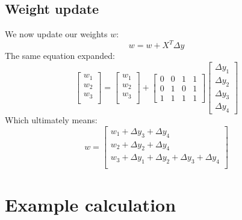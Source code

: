 \documentclass[10pt,a4paper]{article}
\begin{document}
\subsection{Weight update}
We now update our weights $w$:
\begin{equation}
	w = w + X^T\Delta{y}
\end{equation}
The same equation expanded:
\begin{equation}
	\begin{bmatrix}
		w_1 \\
		w_2 \\
		w_3 \\
	\end{bmatrix}
	=
	\begin{bmatrix}
		w_1 \\
		w_2 \\
		w_3 \\
	\end{bmatrix}
	+
	\begin{bmatrix}
		0 & 0 & 1 & 1 \\
		0 & 1 & 0 & 1 \\
		1 & 1 & 1 & 1
	\end{bmatrix}
	\begin{bmatrix}
		\Delta{y_1} \\
		\Delta{y_2} \\
		\Delta{y_3} \\
		\Delta{y_4}
	\end{bmatrix}
\end{equation}
Which ultimately means:
\begin{equation}
	w =
	\begin{bmatrix}
		w_1 + \Delta{y_3} + \Delta{y_4} \\
		w_2 + \Delta{y_2} + \Delta{y_4} \\
		w_3 + \Delta{y_1} + \Delta{y_2} + \Delta{y_3} + \Delta{y_4} \\
	\end{bmatrix}
\end{equation}

\newpage

\section{Example calculation}
\end{document}
